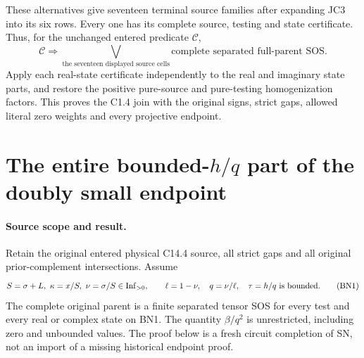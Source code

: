 These alternatives give seventeen terminal source families after
expanding JC3 into its six rows.  Every one has its complete
source, testing and state certificate.  Thus, for the unchanged
entered predicate $\mathcal C$,
\[
 \mathcal C\Longrightarrow
 \bigvee_{\text{the seventeen displayed source cells}}
      \text{complete separated full-parent SOS}.               \tag{JC7}
\]
Apply each real-state certificate independently to the real and
imaginary state parts, and restore the positive pure-source and
pure-testing homogenization factors.  This proves the C1.4 join
with the original signs, strict gaps, allowed literal zero weights
and every projective endpoint.


\section{\texorpdfstring{The entire bounded-$h/q$ part of the doubly small endpoint}{The entire bounded-h/q part of the doubly small endpoint}}
\label{component:p80b0c5b9879f}

\label{p80b0c5b9879f:sec:new-c144-bounded-h-ratio}

\paragraph{Source scope and result.}
Retain the original entered physical C14.4 source, all strict gaps and
all original prior-complement intersections. Assume
\[
 S=\sigma+L,\ \kappa=x/S,\ \nu=\sigma/S
       \in\operatorname{Inf}_{>0},\qquad
 \ell=1-\nu,\quad q=\nu/\ell,\quad
 \tau=h/q\ \hbox{is bounded}.
 \tag{BN1}
\]
The complete original parent is a finite separated tensor SOS for
every test and every real or complex state on BN1. The quantity
$\beta/q^2$ is unrestricted, including zero and unbounded values.
The proof below is a fresh circuit completion of SN, not an import of
a missing historical endpoint proof.

